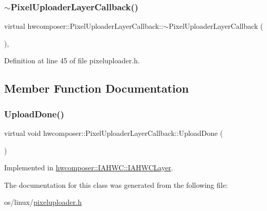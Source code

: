 \subsubsection{\texorpdfstring{$\sim$\+Pixel\+Uploader\+Layer\+Callback()}{~PixelUploaderLayerCallback()}}
{\footnotesize\ttfamily virtual hwcomposer\+::\+Pixel\+Uploader\+Layer\+Callback\+::$\sim$\+Pixel\+Uploader\+Layer\+Callback (\begin{DoxyParamCaption}{ }\end{DoxyParamCaption})\hspace{0.3cm}{\ttfamily [inline]}, {\ttfamily [virtual]}}



Definition at line 45 of file pixeluploader.\+h.


\begin{DoxyCode}{0}
\end{DoxyCode}


\subsection{Member Function Documentation}
\mbox{\label{classhwcomposer_1_1PixelUploaderLayerCallback_a3234bfd4e803b50e8f41cb53ff430559}} 
\subsubsection{\texorpdfstring{Upload\+Done()}{UploadDone()}}
{\footnotesize\ttfamily virtual void hwcomposer\+::\+Pixel\+Uploader\+Layer\+Callback\+::\+Upload\+Done (\begin{DoxyParamCaption}{ }\end{DoxyParamCaption})\hspace{0.3cm}{\ttfamily [pure virtual]}}



Implemented in \mbox{\hyperlink{classhwcomposer_1_1IAHWC_1_1IAHWCLayer_a70158d804e3bf021d32847ffaa33d98d}{hwcomposer\+::\+I\+A\+H\+W\+C\+::\+I\+A\+H\+W\+C\+Layer}}.



The documentation for this class was generated from the following file\+:\begin{DoxyCompactItemize}
\item 
os/linux/\mbox{\hyperlink{pixeluploader_8h}{pixeluploader.\+h}}\end{DoxyCompactItemize}

